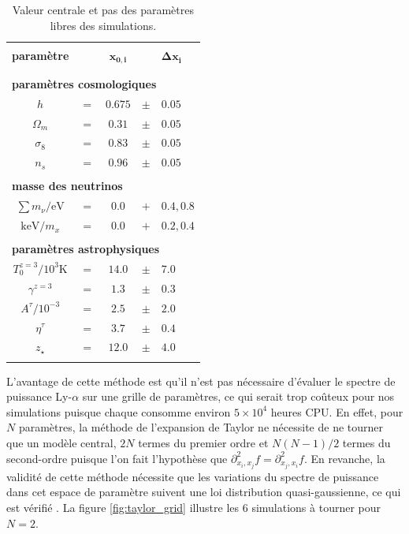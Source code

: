 \begin{table}
\begin{center}
\begin{tabular}{ccccl}
\hline \\[-10pt]
\hline \\[-10pt]
\textbf{paramètre} &  & $\pmb{x_{0,i}}$ & & $\pmb{\Delta x_i}$ \\[2pt]
\hline \\[-10pt]
\hline \\[-10pt]
\multicolumn{5}{l}{\textbf{paramètres cosmologiques}} \\[2pt]
$h$ & $=$ & $0.675$ & $\pm$ & $0.05$  \\[2pt]
$\Omega_m$ & $=$ & $0.31$ & $\pm$ & $0.05$  \\[2pt]
$\sigma_8$ & $=$ & $0.83$ & $\pm$ & $0.05$  \\[2pt]
$n_s$ & $=$ & $0.96$ & $\pm$ & $0.05$  \\[2pt]
\hline \\[-10pt]
\multicolumn{5}{l}{\textbf{masse des neutrinos}} \\[2pt]
$\sum m_\nu / \mathrm{eV}$ & $=$ & $0.0$ & $+$ & $0.4,0.8$  \\[2pt]
$\mathrm{keV}/m_x$ & $=$ & $0.0$ & $+$ & $0.2,0.4$  \\[2pt]
\hline \\[-10pt]
\multicolumn{5}{l}{\textbf{paramètres astrophysiques}} \\[2pt]
$T^{z=3}_0/10^3\mathrm{K}$ & $=$ & $14.0$ & $\pm$ & $7.0$  \\[2pt]
$\gamma^{z=3}$ & $=$ & $1.3$ & $\pm$ & $0.3$  \\[2pt]
$A^\tau / 10^{-3}$ & $=$ & $2.5$ & $\pm$ & $2.0$  \\[2pt]
$\eta^\tau$ & $=$ & $3.7$ & $\pm$ & $0.4$  \\[2pt]
$z_\star$ & $=$ & $12.0$ & $\pm$ & $4.0$  \\[2pt]
\hline \\[-10pt]
\end{tabular}
\caption{Valeur centrale et pas des paramètres libres des simulations.}
\label{tab:parametres}
\end{center}
\end{table}

L'avantage de cette méthode est qu'il n'est pas nécessaire d'évaluer le spectre de puissance Ly-$\alpha$ sur une grille de paramètres, ce qui serait trop coûteux pour nos simulations puisque chaque consomme environ $5 \times 10^4$ heures CPU. En effet, pour $N$ paramètres, la méthode de l'expansion de Taylor ne nécessite de ne tourner que un modèle central, $2N$ termes du premier ordre et $N(N-1)/2$ termes du second-ordre puisque l'on fait l'hypothèse que $\partial^2_{x_i, x_j} f = \partial^2_{x_j, x_i} f$. En revanche, la validité de cette méthode nécessite que les variations du spectre de puissance dans cet espace de paramètre suivent une loi distribution quasi-gaussienne, ce qui est vérifié \citep{Borde2014}. La figure \ref{fig:taylor_grid} illustre les $6$ simulations à tourner pour $N=2$.\\

